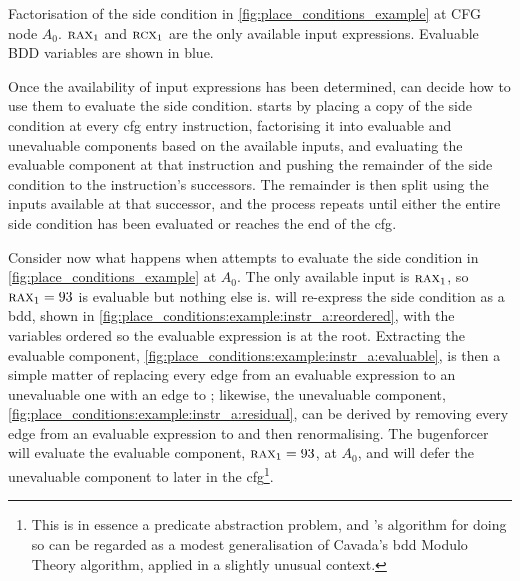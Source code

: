 \begin{sanefig}
{
    \label{fig:place_conditions:example:instr_a:residual}
  }
  \caption{Factorisation of the side condition in
    \autoref{fig:place_conditions_example} at CFG node $A_0$.
    $\textsc{rax}_1$ and $\textsc{rcx}_1$ are the only available input
    expressions.  Evaluable BDD variables are shown in blue.}
  \label{fig:place_conditions_example:instr_a}
\end{sanefig}

\noindent
Once the availability of input expressions has been determined,
{\technique} can decide how to use them to evaluate the side
condition.  {\Technique} starts by placing a copy of the side
condition at every \gls{cfg} entry instruction, factorising it into
evaluable and unevaluable components based on the available inputs,
and evaluating the evaluable component at that instruction and pushing
the remainder of the side condition to the instruction's successors.
The remainder is then split using the inputs available at that
successor, and the process repeats until either the entire side
condition has been evaluated or {\technique} reaches the end of the
\gls{cfg}.

Consider now what happens when {\technique} attempts to evaluate the
side condition in \autoref{fig:place_conditions_example} at $A_0$.
The only available input is $\textsc{rax}_1$, so $\textsc{rax}_1 = 93$
is evaluable but nothing else is.  {\Technique} will re-express the
side condition as a \gls{bdd}, shown in
\autoref{fig:place_conditions:example:instr_a:reordered}, with the
variables ordered so the evaluable expression is at the root.
Extracting the evaluable component,
\autoref{fig:place_conditions:example:instr_a:evaluable}, is then a
simple matter of replacing every edge from an evaluable expression to
an unevaluable one with an edge to \true; likewise, the unevaluable
component, \autoref{fig:place_conditions:example:instr_a:residual},
can be derived by removing every edge from an evaluable expression to
\false and then renormalising.  The \gls{bugenforcer} will evaluate
the evaluable component, $\textsc{rax}_1 = 93$, at $A_0$, and will
defer the unevaluable component to later in the
\gls{cfg}\footnote{This is in essence a predicate abstraction problem,
  and {\technique}'s algorithm for doing so can be regarded as a
  modest generalisation of Cavada's \protect\Gls{bdd} Modulo Theory
  algorithm\cite{cavada2007}, applied in a slightly unusual context.}.

